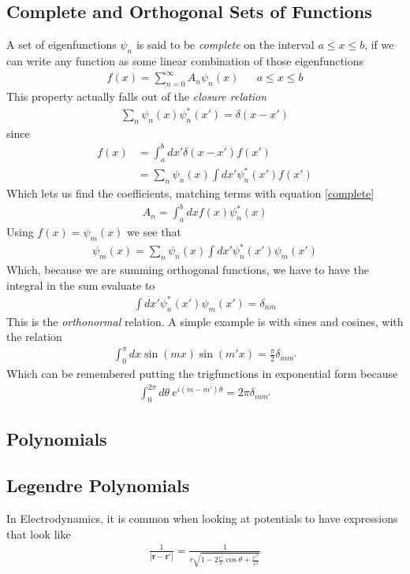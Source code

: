 \subsection{Complete and Orthogonal Sets of Functions}
A set of eigenfunctions $\psi_n$ is said to be \emph{complete} on the interval $a\le x\le b$, if we can write any function as some linear combination of those eigenfunctions 
\begin{align}\label{complete}
f(x) = \sum_{n=0}^\infty A_n \psi_n(x) && a\le x\le b
\end{align}
This property actually falls out of the \emph{closure relation}
\begin{align}
\sum_n \psi_n(x)\psi_n^*(x') = \delta(x-x')
\end{align}
since 
\begin{align}
f(x) &= \int_a^b dx' \delta(x-x')f(x')\\
&= \sum_n \psi_n(x) \int dx' \psi_n^*(x') f(x')
\end{align}
Which lets us find the coefficients, matching terms with equation \ref{complete}
\begin{align}
A_n = \int_{a}^b dx f(x)\psi^*_n(x)
\end{align}
Using $f(x) = \psi_m(x)$ we see that
\begin{align}
\psi_m(x) = \sum_n \psi_n(x) \int dx' \psi_n^*(x') \psi_m(x')
\end{align}
Which, because we are summing orthogonal functions, we have to have the integral in the sum evaluate to
\begin{align}
 \int dx' \psi_n^*(x') \psi_m(x') = \delta_{nm}
\end{align}
This is the \emph{orthonormal} relation. A simple example is with sines and cosines, with the relation
\begin{align}
\int_0^\pi dx\sin (mx)\sin (m'x) = \frac{\pi}{2}\delta_{mm'}
\end{align}
Which can be remembered putting the trigfunctions in exponential form because
\begin{align}
\int_0^{2\pi} d\theta~ e^{i(m-m')\theta} = 2\pi\delta_{mm'}
\end{align}


\subsection{Polynomials}


\subsection{Legendre Polynomials}\label{legendrepoly}
In Electrodynamics, it is common when looking at potentials to have expressions that look like
\begin{align}
\frac{1}{|\textbf{r} - \textbf{r}'|} = \frac{1}{r\sqrt{1-2\frac{r'}{r}\cos\theta + \frac{r'^2}{r^2}}}
\end{align}

